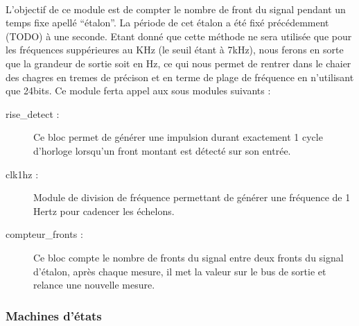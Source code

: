 \documentclass[a4paper,11pt]{article}
\begin{document}
\paragraph{} L'objectif de ce module est de compter le nombre de front du signal pendant un temps fixe apellé ``étalon''.
La période de cet étalon a été fixé précédemment (TODO) à une seconde. Etant donné que cette méthode ne sera utilisée que pour les 
fréquences suppérieures au KHz (le seuil étant à 7kHz), nous ferons en sorte que la grandeur de sortie soit en Hz, ce qui nous permet 
de rentrer dans le chaier des chagres en tremes de précison et en terme de plage de fréquence en n'utilisant que 24bits. Ce module 
ferta appel aux sous modules suivants :

\begin{description}
  \item[rise\_detect : ] Ce bloc permet de générer une impulsion durant exactement 1 cycle d'horloge lorsqu'un front montant est détecté
  sur son entrée.
  \item[clk1hz : ] Module de division de fréquence permettant de générer une fréquence de 1 Hertz pour cadencer les échelons.
  \item[compteur\_fronts : ] Ce bloc compte le nombre de fronts du signal entre deux fronts du signal d'étalon, après chaque mesure,
  il met la valeur sur le bus de sortie et relance une nouvelle mesure.
\end{description}


  \subsubsection{Machines d'états}
\end{document}
